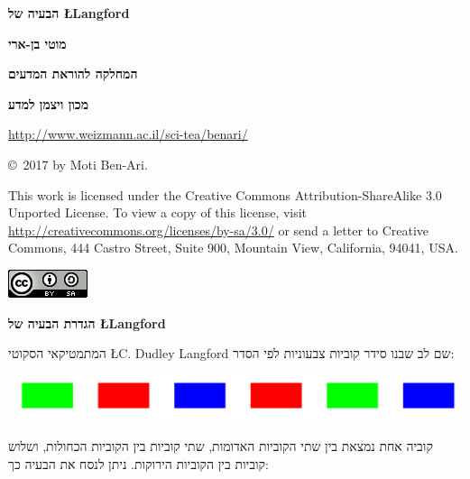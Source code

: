 \documentclass[12pt,a4paper]{article}
\begin{document}
\thispagestyle{empty}


\begin{center}
\textbf{\Huge הבעיה של
\L{Langford}}

\bigskip
\bigskip

\textbf{\Large מוטי בן-ארי}

\bigskip

\textbf{\Large המחלקה להוראת המדעים}

\bigskip

\textbf{\Large מכון ויצמן למדע}

\bigskip

\url{http://www.weizmann.ac.il/sci-tea/benari/}

\bigskip

\end{center}


\begin{center}
\copyright{}\  2017 by Moti Ben-Ari.
\end{center}

\begin{footnotesize}
This work is licensed under the Creative Commons Attribution-ShareAlike 3.0 Unported License. To view a copy of this license, visit \url{http://creativecommons.org/licenses/by-sa/3.0/} or send a letter to Creative Commons, 444 Castro Street, Suite 900, Mountain View, California, 94041, USA.
\end{footnotesize}

\bigskip

\begin{center}
\includegraphics[width=.2\textwidth]{../by-sa.png}
\end{center}

\bigskip

\newpage

\begin{center}
\textbf{\Large הגדרת הבעיה של
\L{Langford}
}
\end{center}

המתמטיקאי הסקוטי
\L{C. Dudley Langford}
שם לב שבנו סידר קוביות צבעוניות לפי הסדר:
\begin{center}
\includegraphics[width=\textwidth]{blocks.png}
\end{center}
קוביה אחת נמצאת בין שתי הקוביות האדומות, שתי קוביות בין הקוביות הכחולות, ושלוש קוביות בין הקוביות הירוקות. ניתן לנסח את הבעיה כך:
\end{document}
